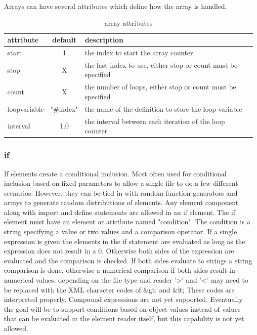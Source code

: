 \documentclass[12pt]{article} %
\begin{document}
 


 Arrays can have several attributes which define how the array is handled.  
  \begin{table}[ht]
  	
  	\caption{array attributes} %
  	\centering %
  	\begin{tabular}{l c p{8cm}} %
  		\hline %
  		attribute & default & description \\ [0.5ex] %
  		\hline %
  		start & 1 & the index to start the array counter \\ %
  		stop & X  & the last index to use, either stop or count must be specified\\
  		count & X & the number of loops, either stop or count must be specified \\
  		loopvariable& "\#index"& the name of the definition to store the loop variable \\
  		interval & 1.0 & the interval between each iteration of the loop counter  \\
  	
  		\hline %
  	\end{tabular}
  	\label{table:arrayAttributes}
  \end{table}
  
 \subsubsection{if}
 If elements create a conditional inclusion.  Most often used for conditional inclusion based on fixed parameters to allow a single file to do a few different scenarios. However, they can be tied in with random function generators and arrays to generate random distributions of elements.  Any element component along with import and define statements are allowed in an if element. 
 The if element must have an element or attribute named "condition".  The condition is a string specifying a value or two values and a comparison operator.  If a single expression is given the elements in the if statement are evaluated as long as the expression does not result in a 0.  Otherwise both sides of the expression are evaluated and the comparison is checked.  If both sides evaluate to strings a string comparison is done, otherwise a numerical comparison if both sides result in numerical values.   depending on the file type and reader '>' and '<' may need to be replaced with the XML character codes of \&gt; and \&lt;  These codes are interpreted properly.  Compound expressions are not yet supported.  Eventually the goal will be to support conditions based on object values instead of values that can be evaluated in the element reader itself, but this capability is not yet allowed.  
\end{document}
